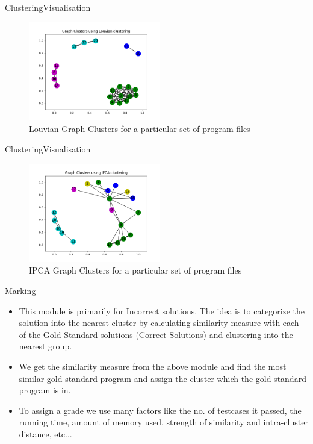 \documentclass{beamer}
\begin{document}
\begin{frame}{Clustering}{Visualisation}
     \begin{figure}[H]
            \centering
            \includegraphics[height=1.7in]{cluster_louvian_old_frama_1.png}
            \caption*{Louvian Graph Clusters for a particular set of program files}
     \end{figure}
\end{frame}
\begin{frame}{Clustering}{Visualisation}
     \begin{figure}
         \centering
         \includegraphics[height=1.7in]{cluster_IPCA_old_frama_1.png}
         \caption*{IPCA Graph Clusters for a particular set of program files}
     \end{figure}
\end{frame}

\begin{frame}{Marking}
     \begin{itemize}
         \item  This module is primarily for Incorrect solutions. The idea is to categorize the solution into the nearest cluster by calculating similarity measure with each of the Gold Standard solutions (Correct Solutions) and clustering into the nearest group.
    
        \item We get the similarity measure from the above module and find the most similar gold standard program and assign the cluster which the gold standard program is in.
    
        \item To assign a grade we use many factors like the no. of testcases it passed, the running time, amount of memory used, strength of similarity and intra-cluster distance, etc...
     \end{itemize}
\end{frame}
\end{document}
